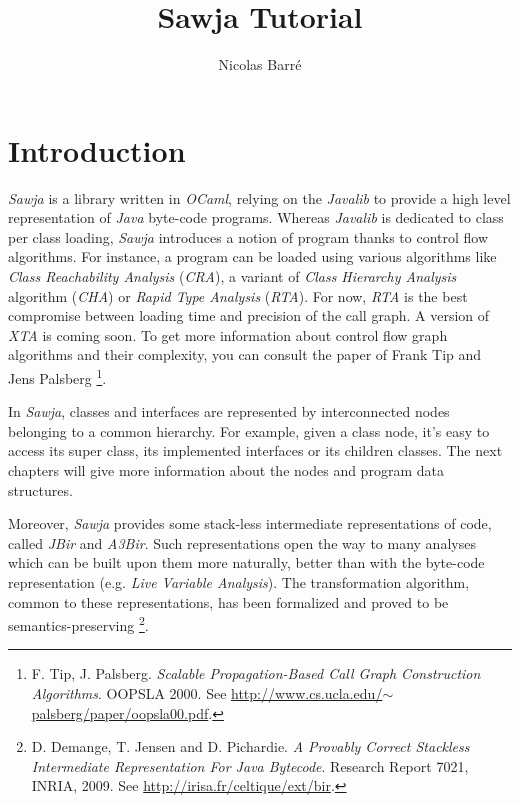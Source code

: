 \documentclass{article}
\title{Sawja Tutorial}
\author{Nicolas Barré}
\begin{document}
\maketitle
\newpage

\tableofcontents
\newpage
\section{Introduction}

\emph{Sawja} is a library written in \emph{OCaml}, relying on the
\emph{Javalib} to provide a high level representation of
\emph{Java} byte-code programs. Whereas \emph{Javalib} is dedicated
to class per class loading, \emph{Sawja} introduces a notion of
program thanks to control flow algorithms. For instance, a program
can be loaded using various algorithms like
\emph{Class Reachability Analysis} (\emph{CRA}), a variant of
\emph{Class Hierarchy Analysis} algorithm (\emph{CHA}) or
\emph{Rapid Type Analysis} (\emph{RTA}). For now, \emph{RTA} is the
best compromise between loading time and precision of the call
graph. A version of \emph{XTA} is coming soon. To get more
information about control flow graph algorithms and their
complexity, you can consult the paper of Frank Tip and Jens
Palsberg%
\footnote{F. Tip, J. Palsberg.
\emph{Scalable Propagation-Based Call Graph Construction Algorithms}.
OOPSLA 2000. See
\href{http://www.cs.ucla.edu/~palsberg/paper/oopsla00.pdf}{http://www.cs.ucla.edu/\ensuremath{\sim}palsberg/paper/oopsla00.pdf}.}.

In \emph{Sawja}, classes and interfaces are represented by
interconnected nodes belonging to a common hierarchy. For example,
given a class node, it's easy to access its super class, its
implemented interfaces or its children classes. The next chapters
will give more information about the nodes and program data
structures.

Moreover, \emph{Sawja} provides some stack-less intermediate
representations of code, called \emph{JBir} and \emph{A3Bir}. Such
representations open the way to many analyses which can be built
upon them more naturally, better than with the byte-code
representation (e.g. \emph{Live Variable Analysis}). The
transformation algorithm, common to these representations, has been
formalized and proved to be semantics-preserving%
\footnote{D. Demange, T. Jensen and D. Pichardie.
\emph{A Provably Correct Stackless Intermediate Representation For Java Bytecode}.
Research Report 7021, INRIA, 2009. See
\href{http://irisa.fr/celtique/ext/bir}{http://irisa.fr/celtique/ext/bir}.}.
\end{document}
